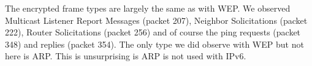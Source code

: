 The encrypted frame types are largely the same as with WEP. We observed Multicast Listener Report Messages (packet 207), Neighbor Solicitations (packet 222), Router Solicitations (packet 256) and of course the ping requests (packet 348) and replies (packet 354). The only type we did observe with WEP but not here is ARP. This is unsurprising is ARP is not used with IPv6.
